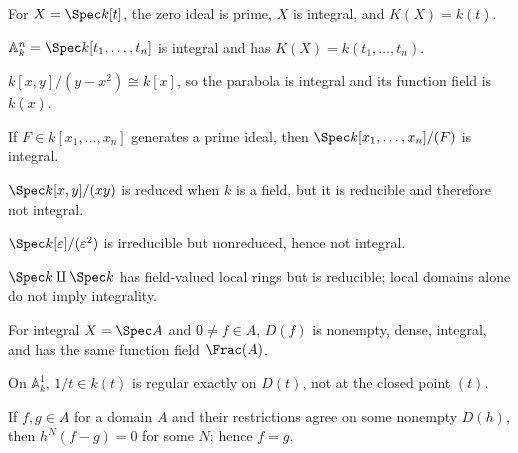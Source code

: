 \begin{example}\label{ex:vi27-01}
For $X=\Spec k[t]$, the zero ideal is prime, $X$ is integral, and $K(X)=k(t)$.
\end{example}

\begin{example}\label{ex:vi27-02}
$\mathbb A^n_k=\Spec k[t_1,\dots,t_n]$ is integral and has $K(X)=k(t_1,\dots,t_n)$.
\end{example}

\begin{example}[Parabola]\label{ex:vi27-03}
$k[x,y]/(y-x^2)\cong k[x]$, so the parabola is integral and its function field is $k(x)$.
\end{example}

\begin{example}\label{ex:vi27-04}
If $F\in k[x_1,\dots,x_n]$ generates a prime ideal, then $\Spec k[x_1,\dots,x_n]/(F)$ is integral.
\end{example}

\begin{example}\label{ex:vi27-05}
$\Spec k[x,y]/(xy)$ is reduced when $k$ is a field, but it is reducible and therefore not integral.
\end{example}

\begin{example}\label{ex:vi27-06}
$\Spec k[\varepsilon]/(\varepsilon^2)$ is irreducible but nonreduced, hence not integral.
\end{example}

\begin{example}\label{ex:vi27-07}
$\Spec k\amalg\Spec k$ has field-valued local rings but is reducible; local domains alone do not imply integrality.
\end{example}

\begin{example}\label{ex:vi27-08}
For integral $X=\Spec A$ and $0\ne f\in A$, $D(f)$ is nonempty, dense, integral, and has the same function field $\Frac(A)$.
\end{example}

\begin{example}\label{ex:vi27-09}
On $\mathbb A^1_k$, $1/t\in k(t)$ is regular exactly on $D(t)$, not at the closed point $(t)$.
\end{example}

\begin{example}\label{ex:vi27-10}
If $f,g\in A$ for a domain $A$ and their restrictions agree on some nonempty $D(h)$, then $h^N(f-g)=0$ for some $N$; hence $f=g$.
\end{example}


